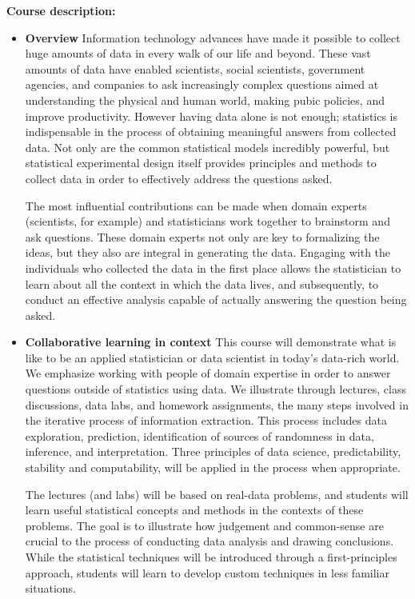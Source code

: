 \documentclass[11pt]{article}
\begin{document}
\noindent 
{\bf Course description:}

\begin{itemize}
\item {\bf Overview}
Information technology advances have made it possible to collect 
huge amounts of data in every walk of our life and beyond. 
These vast amounts of data have enabled scientists, social
scientists, government agencies, and companies to ask increasingly complex questions 
aimed at understanding the physical and human world,
making pubic policies, and improve productivity.
However having data alone is not enough; statistics is indispensable in the process of obtaining
meaningful answers from collected data. Not only are the common statistical models incredibly 
powerful, but statistical experimental 
design itself provides principles and methods
to collect data in order to effectively address the questions asked.

The most influential contributions can be made when domain experts (scientists, for example) and
statisticians work together to brainstorm and ask questions. These domain experts not only are key to
formalizing the ideas, but they also are integral in generating the data. Engaging with the individuals 
who collected the data in the first place allows the statistician to learn about all the 
context in which the data lives, and subsequently, to conduct an effective analysis capable of actually 
answering the question being asked.

\item {\bf Collaborative learning in context}
This course will demonstrate what is like to be an applied statistician
or data scientist in today's data-rich world. We emphasize working with people
of domain expertise in order to answer questions outside of statistics using data. 
We illustrate through lectures, class discussions, data labs, and homework assignments, the many steps involved
in the iterative process of information extraction.
This process includes data exploration, 
prediction, identification of sources of randomness in data, inference, and interpretation.
Three principles of data science, predictability, stability and computability,
will be applied in the process when appropriate.

The lectures (and labs) will be based on real-data problems, and students will learn 
useful statistical concepts and methods in the contexts of these problems. 
The goal is to illustrate how judgement and common-sense
are crucial to the process of conducting data analysis and drawing conclusions. 
While the statistical techniques will be introduced through a first-principles approach, 
students will learn to develop custom techniques in less familiar situations.


\end{itemize}
\end{document}
